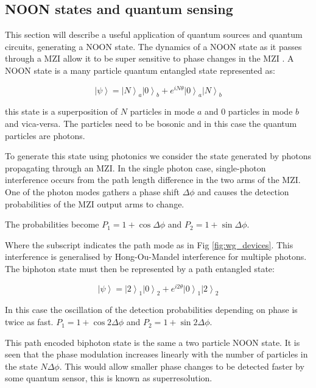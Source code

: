 \subsection{NOON states and quantum sensing}

This section will describe a useful application of quantum sources and quantum
circuits, generating a NOON state. The dynamics of a NOON state as it passes
through a MZI allow it to be super sensitive to phase changes in the MZI \cite{afek2010high, PhysRevLett.107.083601}. A NOON
state is a many particle quantum entangled state represented as:

\begin{equation} \left|\psi\right\rangle = \left|N\right\rangle_{a}
\left|0\right\rangle_{b} + e^{iN\theta} \left|0\right\rangle_{a}
\left|N\right\rangle_{b} \end{equation}

this state is a superposition of $N$ particles in mode $a$ and 0 particles in
mode $b$ and vica-versa. The particles need to be bosonic and in this case the
quantum particles are photons.

To generate this state using photonics we consider the state generated by
photons propagating through an MZI. In the single photon case, single-photon
interference occurs from the path length difference in the two arms of the MZI.
One of the photon modes gathers a phase shift $\Delta \phi$ and causes the
detection probabilities of the MZI output arms to change.

The probabilities become $P_1 = 1 + \cos{\Delta \phi}$ and $P_2 = 1 +
\sin{\Delta \phi}$.

Where the subscript indicates the path mode as in Fig \ref{fig:wg_devices}. This interference is generalised by Hong-Ou-Mandel interference
\cite{hong1987measurement} for multiple photons. The biphoton state must then be
represented by a path entangled state:

\begin{equation} \left|\psi\right\rangle = \left|2\right\rangle_{1}
\left|0\right\rangle_{2} + e^{i2\theta} \left|0\right\rangle_{1}
\left|2\right\rangle_{2} \end{equation}

In this case the oscillation of the detection probabilities depending on phase
is twice as fast. $P_{1} = 1 + \cos{2 \Delta \phi}$ and $P_{2} = 1 +
\sin{2 \Delta \phi}$.

This path encoded biphoton state is the same a two particle NOON state. It is
seen that the phase modulation increases linearly with the number of particles
in the state $N\Delta \phi$. This would allow smaller phase changes to be
detected faster by some quantum sensor, this is known as superresolution.

